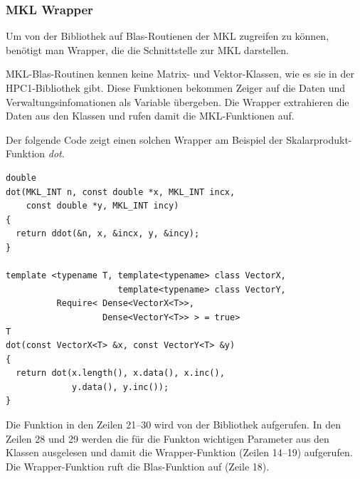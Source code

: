 \subsubsection{MKL Wrapper}
Um von der Bibliothek auf Blas-Routienen der MKL zugreifen zu können, benötigt man Wrapper, die die Schnittstelle zur MKL darstellen.

MKL-Blas-Routinen kennen keine Matrix- und Vektor-Klassen, wie es sie in der HPC1-Bibliothek gibt. Diese Funktionen bekommen Zeiger auf die Daten und Verwaltungsinfomationen als Variable übergeben.
Die Wrapper extrahieren die Daten aus den Klassen und rufen damit die MKL-Funktionen auf.

Der folgende Code zeigt einen solchen Wrapper am Beispiel der Skalarprodukt-Funktion \textit{dot}.
\lstset{numbers=left,firstnumber=14}
\begin{lstlisting}
double
dot(MKL_INT n, const double *x, MKL_INT incx,
    const double *y, MKL_INT incy)
{
  return ddot(&n, x, &incx, y, &incy);
}

template <typename T, template<typename> class VectorX,
                      template<typename> class VectorY,
          Require< Dense<VectorX<T>>,
                   Dense<VectorY<T>> > = true>
T
dot(const VectorX<T> &x, const VectorY<T> &y)
{
  return dot(x.length(), x.data(), x.inc(), 
             y.data(), y.inc());
}
\end{lstlisting}
Die Funktion in den Zeilen 21--30 wird von der Bibliothek aufgerufen.
In den Zeilen 28 und 29 werden die für die Funkton wichtigen Parameter aus den Klassen ausgelesen und damit die Wrapper-Funktion (Zeilen 14--19) aufgerufen. Die Wrapper-Funktion ruft die Blas-Funktion auf (Zeile 18).


%
%

